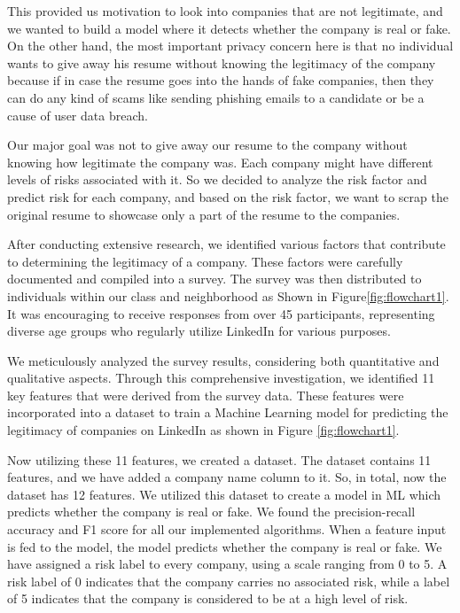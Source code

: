 \documentclass{article}
\begin{document}
This provided us motivation to look into companies that are not legitimate, and we wanted to build a model where it detects whether the company is real or fake. On the other hand, the most important privacy concern here is that no individual wants to give away his resume without knowing the legitimacy of the company because if in case the resume goes into the hands of fake companies, then they can do any kind of scams like sending phishing emails to a candidate or be a cause of user data breach. 

Our major goal was not to give away our resume to the company without knowing how legitimate the company was. Each company might have different levels of risks associated with it. So we decided to analyze the risk factor and predict risk for each company, and based on the risk factor, we want to scrap the original resume to showcase only a part of the resume to the companies. 

After conducting extensive research, we identified various factors that contribute to determining the legitimacy of a company. These factors were carefully documented and compiled into a survey. The survey was then distributed to individuals within our class and neighborhood as Shown in Figure\ref{fig:flowchart1}. It was encouraging to receive responses from over 45 participants, representing diverse age groups who regularly utilize LinkedIn for various purposes.

We meticulously analyzed the survey results, considering both quantitative and qualitative aspects. Through this comprehensive investigation, we identified 11 key features that were derived from the survey data. These features were incorporated into a dataset to train a Machine Learning model for predicting the legitimacy of companies on LinkedIn as shown in Figure \ref{fig:flowchart1}.

Now utilizing these 11 features, we created a dataset. The dataset contains 11 features, and we have added a company name column to it. So, in total, now the dataset has 12 features.  We utilized this dataset to create a model in ML which predicts whether the company is real or fake. We found the precision-recall accuracy and F1 score for all our implemented algorithms. When a feature input is fed to the model, the model predicts whether the company is real or fake. 
We have assigned a risk label to every company, using a scale ranging from 0 to 5. A risk label of 0 indicates that the company carries no associated risk, while a label of 5 indicates that the company is considered to be at a high level of risk.
\end{document}
